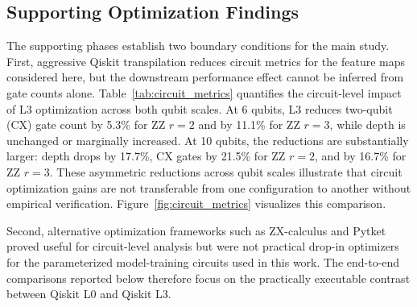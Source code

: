 \documentclass{ieeeaccess}
\begin{document}
\subsection{Supporting Optimization Findings}

The supporting phases establish two boundary conditions for the main study. First, aggressive Qiskit transpilation reduces circuit metrics for the feature maps considered here, but the downstream performance effect cannot be inferred from gate counts alone. Table~\ref{tab:circuit_metrics} quantifies the circuit-level impact of L3 optimization across both qubit scales. At 6 qubits, L3 reduces two-qubit (CX) gate count by 5.3\% for ZZ $r{=}2$ and by 11.1\% for ZZ $r{=}3$, while depth is unchanged or marginally increased. At 10 qubits, the reductions are substantially larger: depth drops by 17.7\%, CX gates by 21.5\% for ZZ $r{=}2$, and by 16.7\% for ZZ $r{=}3$. These asymmetric reductions across qubit scales illustrate that circuit optimization gains are not transferable from one configuration to another without empirical verification. Figure~\ref{fig:circuit_metrics} visualizes this comparison.

Second, alternative optimization frameworks such as ZX-calculus and Pytket proved useful for circuit-level analysis but were not practical drop-in optimizers for the parameterized model-training circuits used in this work. The end-to-end comparisons reported below therefore focus on the practically executable contrast between Qiskit L0 and Qiskit L3.

\begin{table}[t]
\caption{Circuit metrics under L0 (baseline) and L3 (optimized) transpilation for each feature-map variant. Reduction percentages are relative to L0.}
\label{tab:circuit_metrics}
\centering
\setlength{\tabcolsep}{4.5pt}
\end{table}
\end{document}
